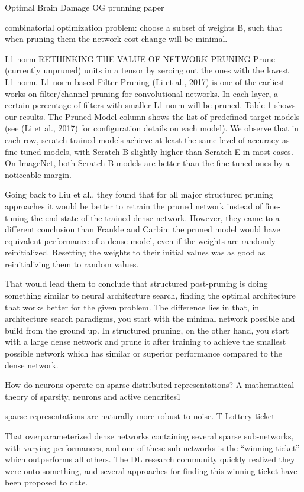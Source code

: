 \documentclass{article}
\begin{document}
Optimal Brain Damage 
OG prunning paper

combinatorial optimization problem: choose a subset of weights B, such that when pruning them the network cost change will be minimal.

L1 norm RETHINKING THE VALUE OF NETWORK PRUNING
Prune (currently unpruned) units in a tensor by zeroing out the ones with the lowest L1-norm.
L1-norm based Filter Pruning (Li et al., 2017) is one of the earliest works on filter/channel pruning
for convolutional networks. In each layer, a certain percentage of filters with smaller L1-norm will
be pruned. Table 1 shows our results. The Pruned Model column shows the list of predefined target
models (see (Li et al., 2017) for configuration details on each model). We observe that in each
row, scratch-trained models achieve at least the same level of accuracy as fine-tuned models, with
Scratch-B slightly higher than Scratch-E in most cases. On ImageNet, both Scratch-B models are
better than the fine-tuned ones by a noticeable margin.

Going back to Liu et al., they found that for all major structured pruning approaches it would be better to retrain the pruned network instead of fine-tuning the end state of the trained dense network. However, they came to a different conclusion than Frankle and Carbin: the pruned model would have equivalent performance of a dense model, even if the weights are randomly reinitialized. Resetting the weights to their initial values was as good as reinitializing them to random values.

That would lead them to conclude that structured post-pruning is doing something similar to neural architecture search, finding the optimal architecture that works better for the given problem. The difference lies in that, in architecture search paradigms, you start with the minimal network possible and build from the ground up.  In structured pruning, on the other hand, you start with a large dense network and prune it after training to achieve the smallest possible network which has similar or superior performance compared to the dense network.


How do neurons operate on sparse distributed representations? A
mathematical theory of sparsity, neurons and active dendrites1

sparse representations are naturally more robust to noise. T
Lottery ticket

That overparameterized dense networks containing several sparse sub-networks, with varying performances, and one of these sub-networks is the “winning ticket” which outperforms all others. The DL research community quickly realized they were onto something, and several approaches for finding this winning ticket have been proposed to date.
\end{document}
